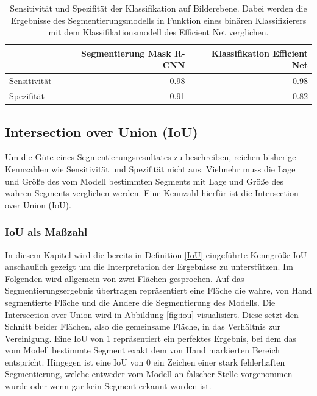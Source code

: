 \begin{table}[H]
\begin{center}
\begin{tabular}{ l | r | r }
   & Segmentierung Mask R-CNN & Klassifikation Efficient Net \\\hline
 Sensitivität & 0.98 & 0.98 \\  
 Spezifität & 0.91 & 0.82    
\end{tabular}
\caption{\label{tab:sensspec} Sensitivität und Spezifität der Klassifikation auf Bilderebene. Dabei werden die Ergebnisse des Segmentierungsmodells in Funktion eines binären Klassifizierers mit dem Klassifikationsmodell des Efficient Net verglichen.}
\end{center}
\end{table}

\subsection{Intersection over Union (IoU)}
Um die Güte eines Segmentierungsresultates zu beschreiben, reichen bisherige Kennzahlen wie Sensitivität und Spezifität nicht aus. Vielmehr muss die Lage und Größe des vom Modell bestimmten Segments mit Lage und Größe des wahren Segments verglichen werden. Eine Kennzahl hierfür ist die Intersection over Union (IoU).
\subsubsection{IoU als Maßzahl}
In diesem Kapitel wird die bereits in Definition \ref{IoU} eingeführte Kenngröße IoU anschaulich gezeigt um die Interpretation der Ergebnisse zu unterstützen.\newline
Im Folgenden wird allgemein von zwei Flächen gesprochen. Auf das Segmentierungsergebnis übertragen repräsentiert eine Fläche die wahre, von Hand segmentierte Fläche und die Andere die Segmentierung des Modells.\newline
Die Intersection over Union wird in Abbildung \ref{fig:iou} visualisiert. Diese setzt den Schnitt beider Flächen, also die gemeinsame Fläche, in das Verhältnis zur Vereinigung. Eine IoU von 1 repräsentiert ein perfektes Ergebnis, bei dem das vom Modell bestimmte Segment exakt dem von Hand markierten Bereich entspricht. Hingegen ist eine IoU von 0 ein Zeichen einer stark fehlerhaften Segmentierung, welche entweder vom Modell an falscher Stelle vorgenommen wurde oder wenn gar kein Segment erkannt worden ist.

